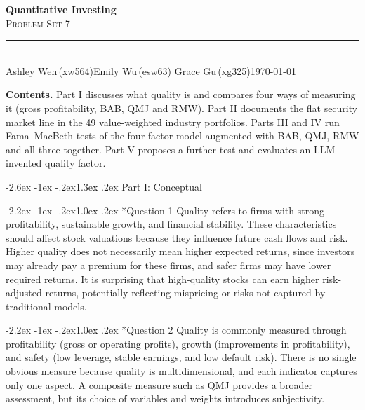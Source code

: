 \documentclass[11pt]{article}
\makeatletter
\renewcommand\section{\@startsection{section}{1}{0pt}%
  {-2.6ex \@plus -1ex \@minus -.2ex}{1.3ex \@plus .2ex}%
  {\normalfont\scshape\large\color{psink}}}   %
\renewcommand\subsection{\@startsection{subsection}{2}{0pt}%
  {-2.2ex \@plus -1ex \@minus -.2ex}{1.0ex \@plus .2ex}%
  {\normalfont\bfseries\normalsize\color{psink}}}
\makeatother
\begin{document}
\thispagestyle{empty}
\begin{flushleft}
{\bfseries\LARGE\color{psink} Quantitative Investing}\\[3pt]
{\scshape\Large\color{psink} Problem Set 7}\\[10pt]
{\color{psrule}\rule{\textwidth}{1.2pt}}\\[5pt]
{\small Ashley Wen\,(xw564)\quad\textbar\quad Emily Wu\,(esw63)%
\quad\textbar\quad Grace Gu\,(xg325)\hfill \today}
\end{flushleft}

\vspace{1.4em}

{\color{psink}\textbf{Contents.}} Part I discusses what quality is and compares four ways of
measuring it (gross profitability, BAB, QMJ and RMW). Part II documents the flat security
market line in the 49 value-weighted industry portfolios. Parts III and IV run Fama--MacBeth
tests of the four-factor model augmented with BAB, QMJ, RMW and all three together. Part V
proposes a further test and evaluates an LLM-invented quality factor.

\vspace{0.8em}


\section{Part I: Conceptual}

\subsection*{Question 1}
Quality refers to firms with strong profitability, sustainable growth, and financial stability. These characteristics should affect stock valuations because they influence future cash flows and risk. Higher quality does not necessarily mean higher expected returns, since investors may already pay a premium for these firms, and safer firms may have lower required returns. It is surprising that high-quality stocks can earn higher risk-adjusted returns, potentially reflecting mispricing or risks not captured by traditional models.

\subsection*{Question 2}
Quality is commonly measured through profitability (gross or operating profits), growth (improvements in profitability), and safety (low leverage, stable earnings, and low default risk). There is no single obvious measure because quality is multidimensional, and each indicator captures only one aspect. A composite measure such as QMJ provides a broader assessment, but its choice of variables and weights introduces subjectivity.
\end{document}

